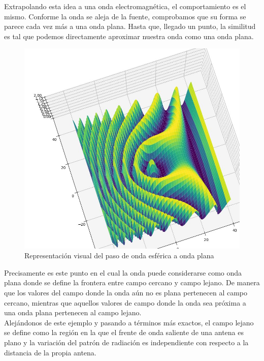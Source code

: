 \documentclass{article}
\begin{document}
Extrapolando esta idea a una onda electromagnética, el comportamiento es el mismo. Conforme la onda se aleja de la fuente, comprobamos que su forma se parece cada vez más a una onda plana. Hasta que, llegado un punto, la similitud es tal que podemos directamente aproximar nuestra onda como una onda plana. 
\begin{figure}[h]
    \centering
    \includegraphics[scale=0.4]{Figura7-Esquema para ejemplificar el paso de onda esferica a onda plana}
    \caption{Representación visual del paso de onda esférica a onda plana}
    \label{Ejemplo-paso-onda-esferica-a-onda-plana}
\end{figure}


\newpage


Precisamente es este punto en el cual la onda puede considerarse como onda plana donde se define la frontera entre campo cercano y campo lejano. 
De manera que los valores del campo donde la onda aún no es plana pertenecen al campo cercano, mientras que aquellos valores de campo donde la onda sea próxima a una onda plana pertenecen al campo lejano. 
\\

Alejándonos de este ejemplo y pasando a términos más exactos, el campo lejano se define como la región en la que el frente de onda saliente de una antena es plano y la variación del patrón de radiación es independiente con respecto a la distancia de la propia antena.\\
\end{document}
